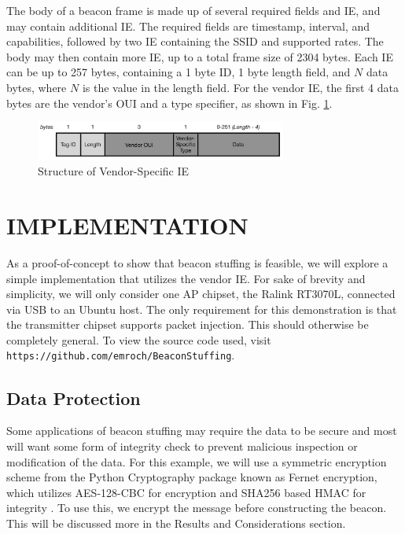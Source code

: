 \documentclass[letterpaper, 10 pt, conference]{ieeeconf}  %
\begin{document}
The body of a beacon frame is made up of several required fields and IE, and may contain additional IE.  The required fields are timestamp, interval, and capabilities, followed by two IE containing the SSID and supported rates. The body may then contain more IE, up to a total frame size of 2304 bytes. Each IE can be up to 257 bytes, containing a 1 byte ID, 1 byte length field, and $N$ data bytes, where $N$ is the value in the length field.  For the vendor IE, the first 4 data bytes are the vendor's OUI and a type specifier, as shown in Fig. \ref{fig:vendorIE}.

\begin{figure}[ht]
	\includegraphics[width=3.25in]{vendorIE.png}
    \caption{Structure of Vendor-Specific IE}
    \label{fig:vendorIE}
\end{figure}


\section{IMPLEMENTATION}

As a proof-of-concept to show that beacon stuffing is feasible, we will explore a simple implementation that utilizes the vendor IE.  For sake of brevity and simplicity, we will only consider one AP chipset, the Ralink RT3070L, connected via USB to an Ubuntu host.  The only requirement for this demonstration is that the transmitter chipset supports packet injection.  This should otherwise be completely general.  To view the source code used, visit {\tt https://github.com/emroch/BeaconStuffing}.

\subsection{Data Protection}

Some applications of beacon stuffing may require the data to be secure and most will want some form of integrity check to prevent malicious inspection or modification of the data.  For this example, we will use a symmetric encryption scheme from the Python Cryptography package known as Fernet encryption, which utilizes AES-128-CBC for encryption and SHA256 based HMAC for integrity \cite{c5}.  To use this, we encrypt the message before constructing the beacon. This will be discussed more in the Results and Considerations section.
\end{document}
